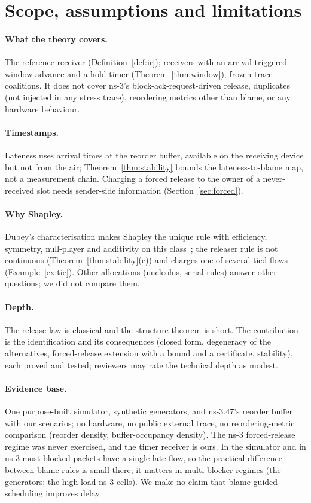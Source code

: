 \documentclass[11pt]{article}
\theoremstyle{definition}
\begin{document}
\section{Scope, assumptions and limitations}\label{sec:scope}
\paragraph{What the theory covers.} The reference receiver (Definition~\ref{def:ir}); receivers with an arrival-triggered window advance and a hold timer (Theorem~\ref{thm:window}); frozen-trace coalitions. It does not cover ns-3's block-ack-request-driven release, duplicates (not injected in any stress trace), reordering metrics other than blame, or any hardware behaviour.
\paragraph{Timestamps.} Lateness uses arrival times at the reorder buffer, available on the receiving device but not from the air; Theorem~\ref{thm:stability} bounds the lateness-to-blame map, not a measurement chain. Charging a forced release to the owner of a never-received slot needs sender-side information (Section~\ref{sec:forced}).
\paragraph{Why Shapley.} Dubey's characterisation makes Shapley the unique rule with efficiency, symmetry, null-player and additivity on this class~\cite{dubey1982airport}; the releaser rule is not continuous (Theorem~\ref{thm:stability}(c)) and charges one of several tied flows (Example~\ref{ex:tie}). Other allocations (nucleolus, serial rules) answer other questions; we did not compare them.
\paragraph{Depth.} The release law is classical and the structure theorem is short. The contribution is the identification and its consequences (closed form, degeneracy of the alternatives, forced-release extension with a bound and a certificate, stability), each proved and tested; reviewers may rate the technical depth as modest.
\paragraph{Evidence base.} One purpose-built simulator, synthetic generators, and ns-3.47's reorder buffer with our scenarios; no hardware, no public external trace, no reordering-metric comparison (reorder density, buffer-occupancy density). The ns-3 forced-release regime was never exercised, and the timer receiver is ours. In the simulator and in ns-3 most blocked packets have a single late flow, so the practical difference between blame rules is small there; it matters in multi-blocker regimes (the generators; the high-load ns-3 cells). We make no claim that blame-guided scheduling improves delay.
\end{document}
